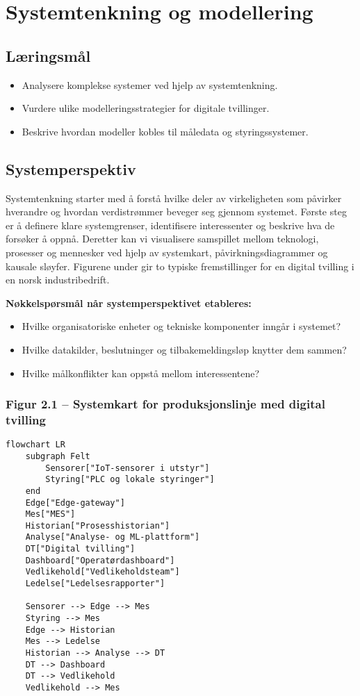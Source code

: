 \chapter{Systemtenkning og modellering}

\section{Læringsmål}
\begin{itemize}
    \item Analysere komplekse systemer ved hjelp av systemtenkning.
    \item Vurdere ulike modelleringsstrategier for digitale tvillinger.
    \item Beskrive hvordan modeller kobles til måledata og styringssystemer.
\end{itemize}

\section{Systemperspektiv}
Systemtenkning starter med å forstå hvilke deler av virkeligheten som påvirker hverandre og hvordan verdistrømmer beveger seg gjennom systemet. Første steg er å definere klare systemgrenser, identifisere interessenter og beskrive hva de forsøker å oppnå. Deretter kan vi visualisere samspillet mellom teknologi, prosesser og mennesker ved hjelp av systemkart, påvirkningsdiagrammer og kausale sløyfer. Figurene under gir to typiske fremstillinger for en digital tvilling i en norsk industribedrift.

\textbf{Nøkkelspørsmål når systemperspektivet etableres:}
\begin{itemize}
    \item Hvilke organisatoriske enheter og tekniske komponenter inngår i systemet?
    \item Hvilke datakilder, beslutninger og tilbakemeldingsløp knytter dem sammen?
    \item Hvilke målkonflikter kan oppstå mellom interessentene?
\end{itemize}

\subsection{Figur 2.1 -- Systemkart for produksjonslinje med digital tvilling}
\begin{verbatim}
flowchart LR
    subgraph Felt
        Sensorer["IoT-sensorer i utstyr"]
        Styring["PLC og lokale styringer"]
    end
    Edge["Edge-gateway"]
    Mes["MES"]
    Historian["Prosesshistorian"]
    Analyse["Analyse- og ML-plattform"]
    DT["Digital tvilling"]
    Dashboard["Operatørdashboard"]
    Vedlikehold["Vedlikeholdsteam"]
    Ledelse["Ledelsesrapporter"]

    Sensorer --> Edge --> Mes
    Styring --> Mes
    Edge --> Historian
    Mes --> Ledelse
    Historian --> Analyse --> DT
    DT --> Dashboard
    DT --> Vedlikehold
    Vedlikehold --> Mes
\end{verbatim}

